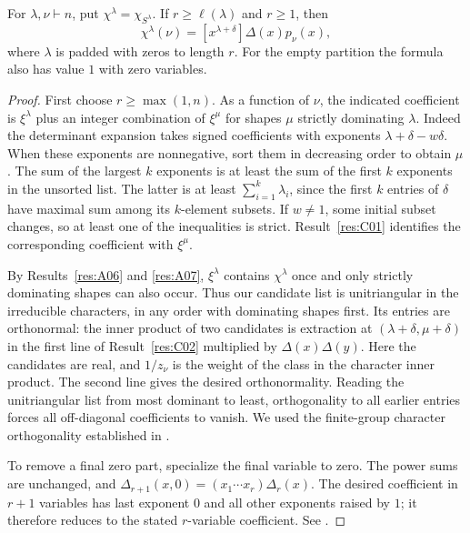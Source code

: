 \begin{theorem}\label{res:C03}
For \(\lambda,\nu\vdash n\), put \(\chi^\lambda=\chi_{S^\lambda}\).
If \(r\ge\ell(\lambda)\) and \(r\ge1\), then
\[
 \chi^\lambda(\nu)
   =[x^{\lambda+\delta}]\Delta(x)p_\nu(x),
\]
where \(\lambda\) is padded with zeros to length \(r\). For the empty
partition the formula also has value \(1\) with zero variables.
\end{theorem}

\begin{proof}
First choose \(r\ge \max(1,n)\). As a function of \(\nu\), the indicated
coefficient is \(\xi^\lambda\) plus an integer combination of
\(\xi^\mu\) for shapes \(\mu\) strictly dominating \(\lambda\).
Indeed the determinant expansion takes signed coefficients with
exponents \(\lambda+\delta-w\delta\). When these exponents are
nonnegative, sort them in decreasing order to obtain \(\mu\).
The sum of the largest \(k\) exponents is at least the sum of the
first \(k\) exponents in the unsorted list. The latter is at least
\(\sum_{i=1}^k\lambda_i\), since the first \(k\) entries of \(\delta\)
have maximal sum among its \(k\)-element subsets. If \(w\ne1\), some
initial subset changes, so at least one of the inequalities is strict.
Result~\ref{res:C01} identifies the corresponding coefficient with
\(\xi^\mu\).

By Results~\ref{res:A06} and \ref{res:A07}, \(\xi^\lambda\) contains
\(\chi^\lambda\) once and only strictly dominating shapes can also
occur. Thus our candidate list is unitriangular in the irreducible
characters, in any order with dominating shapes first. Its entries are
orthonormal: the inner product of two candidates is extraction at
\((\lambda+\delta,\mu+\delta)\) in the first line of
Result~\ref{res:C02} multiplied by \(\Delta(x)\Delta(y)\).
Here the candidates are real, and \(1/z_\nu\) is the weight of the
class in the character inner product. The second line gives the desired
orthonormality. Reading the unitriangular list from most dominant to
least, orthogonality to all earlier entries forces all off-diagonal
coefficients to vanish. We used the finite-group character
orthogonality established in \cite[Chapter 8]{algebra-core}.

To remove a final zero part, specialize the final variable to zero.
The power sums are unchanged, and
\(\Delta_{r+1}(x,0)=(x_1\cdots x_r)\Delta_r(x)\).
The desired coefficient in \(r+1\) variables has last exponent \(0\)
and all other exponents raised by \(1\); it therefore reduces to the
stated \(r\)-variable coefficient. See \cite[Theorem 4.47]{etingof}.
\end{proof}

